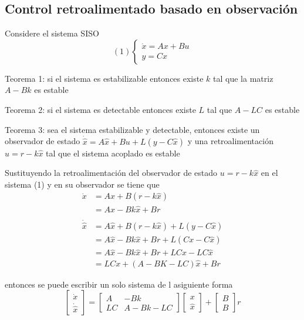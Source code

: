 \subsection{Control retroalimentado basado en observación}

Considere el sistema SISO
\[
    (1)
    \left\{
        \begin{array}{lll}
            \dot{x} = Ax + Bu\\
            y = Cx
        \end{array}
    \right.
\]

Teorema 1: si el sistema es estabilizable entonces existe \( k \) tal que la matriz \( A-Bk \) es estable

Teorema 2: si el sistema es detectable entonces existe \( L \) tal que \( A-LC \) es estable

Teorema 3: sea el sistema estabilizable y detectable, entonces existe un observador de estado \( \dot{\hat{x}} = A\hat{x} + Bu + L(y-C\hat{x}) \) y una retroalimentación \( u=r-k\hat{x} \) tal que el sistema acoplado es estable

Sustituyendo la retroalimentación del observador de estado \( u = r-k \hat{x} \) en el sistema (1) y en su observador se tiene que 
\[
    \begin{split}
        \dot{x} & = Ax + B(r-k\hat{x})\\
        & = Ax - Bk\hat{x} + Br \\ \\
        \dot{\hat{x}} & = A\hat{x} + B(r-k\hat{x}) + L(y-C\hat{x}) \\
        & = A\hat{x} - Bk\hat{x} + Br + L(Cx-C\hat{x}) \\
        & = A\hat{x} - Bk\hat{x} + Br + LCx - LC\hat{x} \\
        & = LCx + (A - BK - LC)\hat{x} +Br
    \end{split}
\]

entonces se puede escribir un solo sistema de l asiguiente forma
\[
    \begin{bmatrix}
        \dot{x} \\ \dot{\hat{x}}
    \end{bmatrix} =
    \begin{bmatrix}
        A & -Bk \\
        LC & A-Bk-LC 
    \end{bmatrix}
    \begin{bmatrix}
        x \\ \hat{x}
    \end{bmatrix} +
    \begin{bmatrix}
        B \\ B
    \end{bmatrix} r
\]